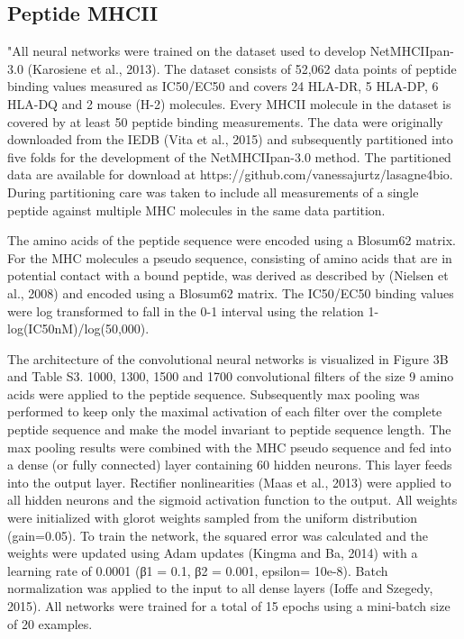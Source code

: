 \documentclass[]{scrartcl}
\begin{document}
\subsection{Peptide MHCII}
"All neural networks were trained on the dataset used to develop NetMHCIIpan-3.0 (Karosiene et al., 2013). The dataset consists of 52,062 data points of peptide binding values measured as IC50/EC50 and covers 24 HLA-DR, 5 HLA-DP, 6 HLA-DQ and 2 mouse (H-2) molecules. Every MHCII molecule in the dataset is covered by at least 50 peptide binding measurements. The data were originally downloaded from the IEDB (Vita et al., 2015) and subsequently partitioned into five folds for the development of the NetMHCIIpan-3.0 method. The partitioned data are available for download at https://github.com/vanessajurtz/lasagne4bio. During partitioning care was taken to include all measurements of a single peptide against multiple MHC molecules in the same data partition.

The amino acids of the peptide sequence were encoded using a Blosum62 matrix. For the MHC molecules a pseudo sequence, consisting of amino acids that are in potential contact with a bound peptide, was derived as described by (Nielsen et al., 2008) and encoded using a Blosum62 matrix. The IC50/EC50 binding values were log transformed to fall in the 0-1 interval using the relation 1-log(IC50nM)/log(50,000).

The architecture of the convolutional neural networks is visualized in Figure 3B and Table S3. 1000, 1300, 1500 and 1700 convolutional filters of the size 9 amino acids were applied to the peptide sequence. Subsequently max pooling was performed to keep only the maximal activation of each filter over the complete peptide sequence and make the model invariant to peptide sequence length. The max pooling results were combined with the MHC pseudo sequence and fed into a dense (or fully connected) layer containing 60 hidden neurons. This layer feeds into the output layer. Rectifier nonlinearities (Maas et al., 2013) were applied to all hidden neurons and the sigmoid activation function to the output. All weights were initialized with glorot weights sampled from the uniform distribution (gain=0.05). To train the network, the squared error was calculated and the weights were updated using Adam updates (Kingma and Ba, 2014) with a learning rate of 0.0001 (β1 = 0.1, β2 = 0.001, epsilon= 10e-8). Batch normalization was applied to the input to all dense layers (Ioffe and Szegedy, 2015). All networks were trained for a total of 15 epochs using a mini-batch size of 20 examples.
\end{document}
